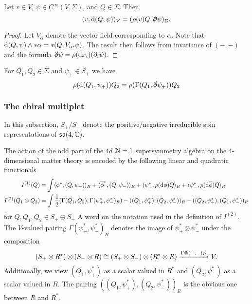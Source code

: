 \documentclass[10pt, oneside]{article}
\begin{document}
\begin{lem}
\label{lem: oneform}
Let $v \in V$, $\psi \in C^\infty(V, \Sigma)$, and $Q \in \Sigma$. 
Then
\[
(v, \d (Q, \psi))_V = (\rho(v)Q, \sd \dd \psi)_{\Sigma} .
\]
\end{lem}
\begin{proof}
Let $V_\alpha$ denote the vector field corresponding to $\alpha$. 
Note that ${\rm d}(Q,\psi) \wedge * \alpha = * (Q, V_\alpha . \psi)$. 
The result then follows from invariance of $(-,-)$ and the formula $\sd \dd \psi = \rho(\d x_i) (\partial_i \psi)$. 
\end{proof}

\begin{lem}
\label{lem: silly}
For $Q_1,Q_2 \in \Sigma$ and $\psi_+ \in S_+$ we have
\[
\rho(\d(Q_1, \psi_+)) Q_2 = \rho(\Gamma(Q_1, \sd \dd \psi_+))Q_2
\]
\end{lem}


\subsubsection{The chiral multiplet}

In this subsection, $S_+ / S_-$ denote the positive/negative irreducible spin representations of $\mathfrak{so}(4; \mathbb C)$. 

The action of the odd part of the $4d$ $\mathcal N=1$ supersymmetry algebra on the $4$-dimensional matter theory is encoded by the following linear and quadratic functionals 
\begin{align*}
I^{(1)}(Q) & = \int \langle\phi^*, (Q, \psi_+)\rangle_R + \langle\overline{\phi}^*, (Q, \psi_-)\rangle_R + \langle\psi_+^*, \rho({\rm d} \phi)Q \rangle_R +  \langle\psi_-^*, \rho({\rm d} \overline{\phi})Q \rangle_R \\
I^{(2)}  (Q_1 \otimes Q_2) & = \int \frac{1}{2}(\Gamma(Q_1, Q_2), \Gamma(\psi_+^*, \psi_-^*)_R) - ((Q_1, \psi_+^*),(Q_2, \psi_-^*))_R - ((Q_2, \psi_+^*),(Q_1, \psi_-^*))_R
\end{align*}
for $Q, Q_1, Q_2 \in S_+ \oplus S_-$
A word on the notation used in the definition of $I^{(2)}$. 
The $V$-valued pairing $\Gamma(\psi_+^*, \psi_-^*)_R$ denotes the image of $\psi_+^* \otimes \psi_-^*$ under the composition
\[
(S_+ \otimes R^*) \otimes (S_- \otimes R) \cong (S_+ \otimes S_-) \otimes (R^* \otimes R) \xrightarrow{\Gamma \otimes (-,-)_R} V .
\]
Additionally, we view $(Q_1, \psi_+^*)$ as a scalar valued in $R^*$ and $(Q_2, \psi_-^*)$ as a scalar valued in $R$. 
The pairing $((Q_1, \psi_+^*),(Q_2, \psi_-^*))_R$ is the obvious one between $R$ and $R^*$. 
\end{document}
